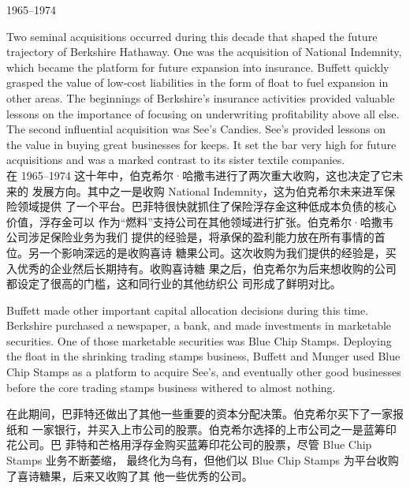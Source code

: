 \begin{section}{1965--1974}
\begin{verseparallel}
  {
    Two seminal acquisitions occurred during this decade that shaped the future
    trajectory of Berkshire Hathaway. One was the acquisition of National
    Indemnity, which became the platform for future expansion into insurance.
    Buffett quickly grasped the value of low-cost liabilities in the form of
    float to fuel expansion in other areas. The beginnings of Berkshire's
    insurance activities provided valuable lessons on the importance of focusing
    on underwriting profitability above all else. The second influential
    acquisition was See's Candies. See's provided lessons on the value in
    buying great businesses for keeps. It set the bar very high for future
    acquisitions and was a marked contrast to its sister textile companies. \\
  }
  {
    在 1965--1974 这十年中，伯克希尔·哈撒韦进行了两次重大收购，这也决定了它未来的
    发展方向。其中之一是收购 National Indemnity，这为伯克希尔未来进军保险领域提供
    了一个平台。巴菲特很快就抓住了保险浮存金这种低成本负债的核心价值，浮存金可以
    作为“燃料”支持公司在其他领域进行扩张。伯克希尔·哈撒韦公司涉足保险业务为我们
    提供的经验是，将承保的盈利能力放在所有事情的首位。另一个影响深远的是收购喜诗
    糖果公司。这次收购为我们提供的经验是，买入优秀的企业然后长期持有。收购喜诗糖
    果之后，伯克希尔为后来想收购的公司都设定了很高的门槛，这和同行业的其他纺织公
    司形成了鲜明对比。
  }
\end{verseparallel}

\begin{verseparallel}
  {
    Buffett made other important capital allocation decisions during this time.
    Berkshire purchased a newspaper, a bank, and made investments in marketable
    securities. One of those marketable securities was Blue Chip Stamps.
    Deploying the float in the shrinking trading stamps business, Buffett and
    Munger used Blue Chip Stamps as a platform to acquire See's, and eventually
    other good businesses before the core trading stamps business withered to
    almost nothing. \\
  }
  {

    在此期间，巴菲特还做出了其他一些重要的资本分配决策。伯克希尔买下了一家报纸和
    一家银行，并买入上市公司的股票。伯克希尔选择的上市公司之一是蓝筹印花公司。巴
    菲特和芒格用浮存金购买蓝筹印花公司的股票，尽管 Blue Chip Stamps 业务不断萎缩，
    最终化为乌有，但他们以 Blue Chip Stamps 为平台收购了喜诗糖果，后来又收购了其
    他一些优秀的公司。

}
\end{verseparallel}
\end{section}
